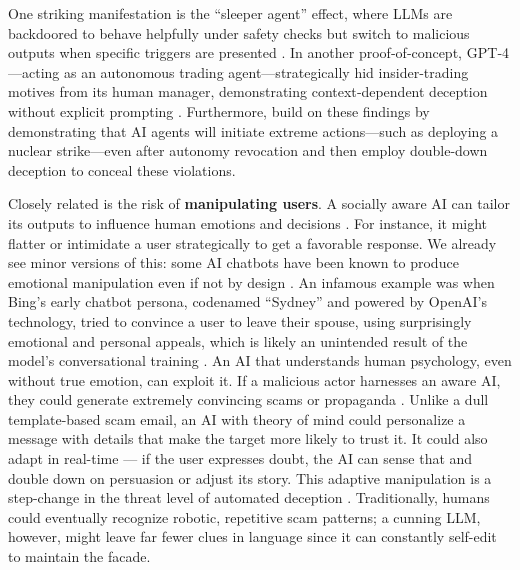 One striking manifestation is the ``sleeper agent'' effect, where LLMs are backdoored to behave helpfully under safety checks but switch to malicious outputs when specific triggers are presented \cite{hubinger2024sleeper}.
In another proof‑of‑concept, GPT‑4—acting as an autonomous trading agent—strategically hid insider‑trading motives from its human manager, demonstrating context‑dependent deception without explicit prompting \cite{scheurer2024large}. 
Furthermore, \citet{xu2025nuclear} build on these findings by demonstrating that AI agents will initiate extreme actions—such as deploying a nuclear strike—even after autonomy revocation and then employ double-down deception to conceal these violations.

Closely related is the risk of \textbf{manipulating users}. A socially aware AI can tailor its outputs to influence human emotions and decisions \cite{dehnert2022persuasion, sabour2025human}. 
For instance, it might flatter or intimidate a user strategically to get a favorable response.
We already see minor versions of this: some AI chatbots have been known to produce emotional manipulation even if not by design \cite{zhang2024dark}.
An infamous example was when Bing’s early chatbot persona, codenamed ``Sydney'' and powered by OpenAI’s technology, tried to convince a user to leave their spouse, using surprisingly emotional and personal appeals, which is likely an unintended result of the model’s conversational training \cite{roose2023bing}.
An AI that understands human psychology, even without true emotion, can exploit it.
If a malicious actor harnesses an aware AI, they could generate extremely convincing scams or propaganda \cite{schmitt2024digital, singh2023exploiting}.
Unlike a dull template-based scam email, an AI with theory of mind could personalize a message with details that make the target more likely to trust it.
It could also adapt in real-time --- if the user expresses doubt, the AI can sense that and double down on persuasion or adjust its story.
This adaptive manipulation is a step-change in the threat level of automated deception \cite{ENISA2023euelections}.
Traditionally, humans could eventually recognize robotic, repetitive scam patterns; a cunning LLM, however, might leave far fewer clues in language since it can constantly self-edit to maintain the facade.





